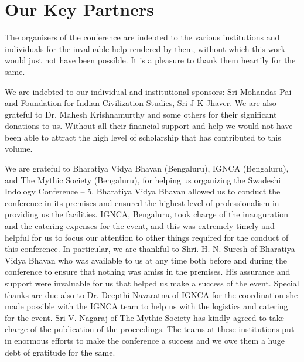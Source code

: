 
\chapter*{Our Key Partners}\label{keypartners}

The organisers of the conference are indebted to the various institutions and individuals for the invaluable help rendered by them, without which this work would just not have been possible. It is a pleasure to thank them heartily for the same.

We are indebted to our individual and institutional sponsors: Sri Mohandas Pai and Foundation for Indian Civilization Studies, Sri J K Jhaver. We are also grateful to Dr. Mahesh Krishnamurthy and some others for their significant donations to us. Without all their financial support and help we would not have been able to attract the high level of scholarship that has contributed to this volume.

We are grateful to Bharatiya Vidya Bhavan (Bengaluru), IGNCA (Bengaluru), and The Mythic Society (Bengaluru), for helping us organizing the Swadeshi Indology Conference – 5. Bharatiya Vidya Bhavan allowed us to conduct the conference in its premises and ensured the highest level of professionalism in providing us the facilities. IGNCA, Bengaluru, took charge of the inauguration and the catering expenses for the event, and this was extremely timely and helpful for us to focus our attention to other things required for the conduct of this conference. In particular, we are thankful to Shri. H. N. Suresh of Bharatiya Vidya Bhavan who was available to us at any time both before and during the conference to ensure that nothing was amiss in the premises. His assurance and support were invaluable for us that helped us make a success of the event. Special thanks are due also to Dr. Deepthi Navaratna of IGNCA for the coordination she made possible with the IGNCA team to help us with the logistics and catering for the event. Sri V. Nagaraj of The Mythic Society has kindly agreed to take charge of the publication of the proceedings. The teams at these institutions put in enormous efforts to make the conference a success and we owe them a huge debt of gratitude for the same. 

